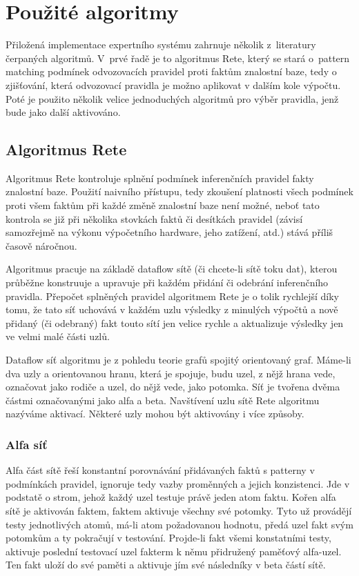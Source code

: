 \section{Použité algoritmy}
Přiložená implementace expertního systému zahrnuje několik z~literatury
čerpaných algoritmů. V~prvé řadě je to algoritmus Rete, který se stará o~pattern
matching podmínek odvozovacích pravidel proti faktům znalostní baze, tedy o
zjišťování, která odvozovací pravidla je možno aplikovat v dalším kole výpočtu.
Poté je použito několik velice jednoduchých algoritmů pro výběr pravidla, jenž
bude jako další aktivováno.

\subsection{Algoritmus Rete}
Algoritmus Rete kontroluje splnění podmínek inferenčních pravidel fakty
znalostní baze. Použití naivního přístupu, tedy zkoušení platnosti všech
podmínek proti všem faktům při každé změně znalostní baze není možné, neboť
tato kontrola se již při několika stovkách faktů či desítkách pravidel
(závisí samozřejmě na výkonu výpočetního hardware, jeho zatížení, atd.)
stává příliš časově náročnou.

Algoritmus pracuje na základě dataflow sítě (či chcete-li sítě toku dat),
kterou průběžne konstruuje a upravuje při každém přidání či odebrání
inferenčního pravidla. Přepočet splněných pravidel algoritmem Rete je o tolik
rychlejší díky tomu, že tato síť uchovává v každém uzlu výsledky z minulých
výpočtů a nově přidaný (či odebraný) fakt touto sítí jen velice rychle
 a aktualizuje výsledky jen ve velmi malé části uzlů.

Dataflow síť algoritmu je z pohledu teorie grafů spojitý orientovaný graf.
Máme-li dva uzly a orientovanou hranu, která je spojuje, budu uzel, z nějž
hrana vede, označovat jako rodiče a uzel, do nějž vede, jako potomka.
Síť je tvořena dvěma částmi označovanými jako alfa a beta. Navštívení uzlu
sítě Rete algoritmu nazýváme aktivací. Některé uzly mohou být aktivovány
i více způsoby.

\subsubsection{Alfa síť}
Alfa část sítě řeší konstantní porovnávání přidávaných faktů s patterny
v podmínkách pravidel, ignoruje tedy vazby proměnných a jejich konzistenci.
Jde v podstatě o strom, jehož každý uzel testuje právě jeden atom faktu.
Kořen alfa sítě je aktivován faktem, faktem aktivuje všechny své potomky.
Tyto už provádějí testy jednotlivých atomů, má-li atom požadovanou hodnotu,
předá uzel fakt svým potomkům a ty pokračují v testování. Projde-li fakt
všemi konstatními testy, aktivuje poslední testovací uzel fakterm k němu
přidružený paměťový alfa-uzel. Ten fakt uloží do své paměti a aktivuje
jím své následníky v beta částí sítě.

